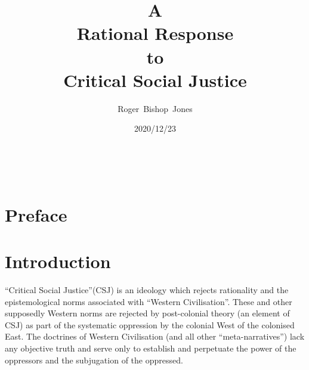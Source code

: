 \documentclass[10pt,titlepage]{article}
\title{\bf\LARGE A\\ Rational Response\\ to\\ Critical Social Justice\\}
\author{Roger~Bishop~Jones}
\date{\small 2020/12/23}
\newcommand{\ignore}[1]{}
\begin{document}
% 
                               
\begin{titlepage}
\maketitle





\end{titlepage}

\ \

\ignore{
\begin{centering}
{}
\end{centering}
}%

\setcounter{tocdepth}{2}
{\parskip-0pt\tableofcontents}


\pagebreak

\section*{Preface}



\section{Introduction}

``Critical Social Justice''(CSJ) is an ideology which rejects rationality and the epistemological norms associated with ``Western Civilisation''.
These and other supposedly Western norms are rejected by post-colonial theory (an element of CSJ) as part of the systematic oppression by the colonial West of the colonised East.
The doctrines of Western Civilisation (and all other ``meta-narratives'') lack any objective truth and serve only to establish and perpetuate the power of the oppressors and the subjugation of the oppressed.
\end{document}
